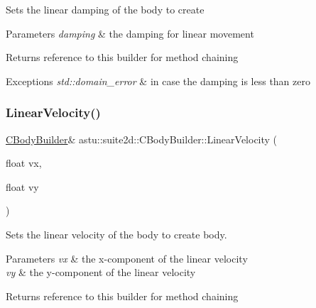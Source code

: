 Sets the linear damping of the body to create


\begin{DoxyParams}{Parameters}
{\em damping} & the damping for linear movement \\
\hline
\end{DoxyParams}
\begin{DoxyReturn}{Returns}
reference to this builder for method chaining 
\end{DoxyReturn}

\begin{DoxyExceptions}{Exceptions}
{\em std\+::domain\+\_\+error} & in case the damping is less than zero \\
\hline
\end{DoxyExceptions}
\mbox{\label{classastu_1_1suite2d_1_1CBodyBuilder_a15294ce7b267061e70013553cc3c171d}} 
\subsubsection{\texorpdfstring{Linear\+Velocity()}{LinearVelocity()}\hspace{0.1cm}{\footnotesize\ttfamily [1/2]}}
{\footnotesize\ttfamily \hyperlink{classastu_1_1suite2d_1_1CBodyBuilder}{C\+Body\+Builder}\& astu\+::suite2d\+::\+C\+Body\+Builder\+::\+Linear\+Velocity (\begin{DoxyParamCaption}\item[{float}]{vx,  }\item[{float}]{vy }\end{DoxyParamCaption})\hspace{0.3cm}{\ttfamily [inline]}}

Sets the linear velocity of the body to create body.


\begin{DoxyParams}{Parameters}
{\em vx} & the x-\/component of the linear velocity \\
\hline
{\em vy} & the y-\/component of the linear velocity \\
\hline
\end{DoxyParams}
\begin{DoxyReturn}{Returns}
reference to this builder for method chaining 
\end{DoxyReturn}
\mbox{\label{classastu_1_1suite2d_1_1CBodyBuilder_a3b30b6a22dbbace93d0867cb04131b5c}} 
